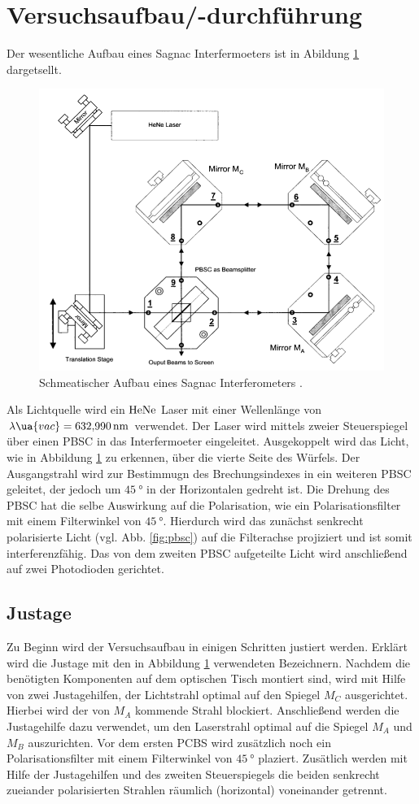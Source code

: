 \section{Versuchsaufbau/-durchführung}
Der wesentliche Aufbau eines Sagnac Interfermoeters ist in Abildung \ref{fig:sagnac_interferometer}
dargetsellt.
\begin{figure}
\centering
\includegraphics[width=0.6\linewidth]{./content/images/aufbau.png}
\caption{Schmeatischer Aufbau eines Sagnac Interferometers \cite{anleitung64}.}
\label{fig:sagnac_interferometer}
\end{figure}
Als Lichtquelle wird ein $\ce{HeNe}$ Laser mit einer Wellenlänge von
$\lambda\ua{vac}=\SI{632.990}{\nano\meter}$ verwendet. Der Laser wird mittels zweier Steuerspiegel
über einen PBSC in das Interfermoeter eingeleitet. Ausgekoppelt wird das Licht, wie
in Abbildung \ref{fig:sagnac_interferometer} zu erkennen, über die vierte Seite
des Würfels.
Der Ausgangstrahl wird zur Bestimmugn des Brechungsindexes in ein weiteren
PBSC geleitet, der jedoch um $\SI{45}{\degree}$ in der Horizontalen gedreht ist.
Die Drehung des PBSC hat die selbe Auswirkung auf die Polarisation, wie ein Polarisationsfilter mit
einem Filterwinkel von $\SI{45}{\degree}$. Hierdurch wird das zunächst senkrecht
polarisierte Licht (vgl. Abb. \ref{fig:pbsc}) auf die Filterachse projiziert und
ist somit interferenzfähig. Das von dem zweiten PBSC aufgeteilte Licht wird
anschließend auf zwei Photodioden gerichtet.

\subsection{Justage}
Zu Beginn wird der Versuchsaufbau in einigen Schritten justiert werden.
Erklärt wird die Justage mit den in Abbildung \ref{fig:sagnac_interferometer} verwendeten Bezeichnern.
Nachdem die benötigten Komponenten auf dem optischen Tisch montiert sind,
wird mit Hilfe von zwei Justagehilfen, der Lichtstrahl optimal auf den Spiegel $M_C$
ausgerichtet. Hierbei wird der von $M_A$ kommende Strahl blockiert.
Anschließend werden die Justagehilfe dazu verwendet, um den Laserstrahl optimal auf
die Spiegel $M_A$ und $M_B$ auszurichten. Vor dem ersten PCBS wird zusätzlich noch ein Polarisationsfilter
mit einem Filterwinkel von $\SI{45}{\degree}$ plaziert. Zusätlich werden mit Hilfe der Justagehilfen
und des zweiten Steuerspiegels die beiden senkrecht zueiander polarisierten Strahlen räumlich (horizontal)
voneinander getrennt.

